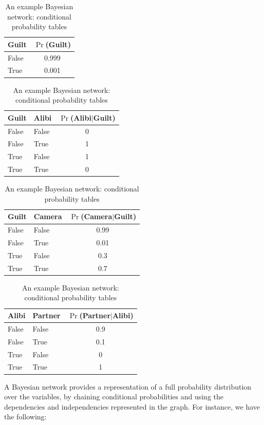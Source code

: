 \documentclass[10pt]{article}
\begin{document}
\begin{table}
	\centering
		\begin{tabular}{lc}
			Guilt & $\Pr$(Guilt)\\
			\hline
			False & 0.999\\
			True & 0.001\\
		\end{tabular}
		\begin{tabular}{llc}
			Guilt &Alibi& $\Pr$(Alibi$|$Guilt)\\
			\hline
			False & False & 0\\
			False & True & 1\\
			True & False & 1\\
			True & True & 0\\
		\end{tabular}
		\begin{tabular}{llc}
			Guilt &Camera& $\Pr$(Camera$|$Guilt)\\
			\hline
			False & False & 0.99\\
			False & True & 0.01\\
			True & False & 0.3\\
			True & True & 0.7\\
		\end{tabular}
		\begin{tabular}{llc}
			Alibi &Partner& $\Pr$(Partner$|$Alibi)\\
			\hline
			False & False & 0.9\\
			False & True & 0.1\\
			True & False & 0\\
			True & True & 1\\
		\end{tabular}
\caption{An example Bayesian network: conditional probability tables\label{tab:BN}}
\end{table}

A Bayesian network provides a representation of a full probability distribution over the variables, by chaining conditional probabilities and using the dependencies and independencies represented in the graph. For instance, we have the following:
\end{document}
